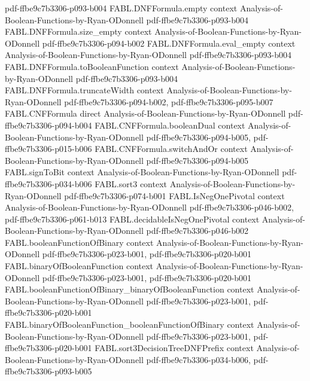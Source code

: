 \begin{theorem}
  {pdf-ffbe9c7b3306-p093-b004}
\proofstep
  {FABL.DNFFormula.empty}
  {context}
  {Analysis-of-Boolean-Functions-by-Ryan-ODonnell}
  {pdf-ffbe9c7b3306-p093-b004}
\proofstep
  {FABL.DNFFormula.size_empty}
  {context}
  {Analysis-of-Boolean-Functions-by-Ryan-ODonnell}
  {pdf-ffbe9c7b3306-p094-b002}
\proofstep
  {FABL.DNFFormula.eval_empty}
  {context}
  {Analysis-of-Boolean-Functions-by-Ryan-ODonnell}
  {pdf-ffbe9c7b3306-p093-b004}
\proofstep
  {FABL.DNFFormula.toBooleanFunction}
  {context}
  {Analysis-of-Boolean-Functions-by-Ryan-ODonnell}
  {pdf-ffbe9c7b3306-p093-b004}
\proofstep
  {FABL.DNFFormula.truncateWidth}
  {context}
  {Analysis-of-Boolean-Functions-by-Ryan-ODonnell}
  {pdf-ffbe9c7b3306-p094-b002,
    pdf-ffbe9c7b3306-p095-b007}
\proofstep
  {FABL.CNFFormula}
  {direct}
  {Analysis-of-Boolean-Functions-by-Ryan-ODonnell}
  {pdf-ffbe9c7b3306-p094-b004}
\proofstep
  {FABL.CNFFormula.booleanDual}
  {context}
  {Analysis-of-Boolean-Functions-by-Ryan-ODonnell}
  {pdf-ffbe9c7b3306-p094-b005,
    pdf-ffbe9c7b3306-p015-b006}
\proofstep
  {FABL.CNFFormula.switchAndOr}
  {context}
  {Analysis-of-Boolean-Functions-by-Ryan-ODonnell}
  {pdf-ffbe9c7b3306-p094-b005}
\proofstep
  {FABL.signToBit}
  {context}
  {Analysis-of-Boolean-Functions-by-Ryan-ODonnell}
  {pdf-ffbe9c7b3306-p034-b006}
\proofstep
  {FABL.sort3}
  {context}
  {Analysis-of-Boolean-Functions-by-Ryan-ODonnell}
  {pdf-ffbe9c7b3306-p074-b001}
\proofstep
  {FABL.IsNegOnePivotal}
  {context}
  {Analysis-of-Boolean-Functions-by-Ryan-ODonnell}
  {pdf-ffbe9c7b3306-p046-b002,
    pdf-ffbe9c7b3306-p061-b013}
\proofstep
  {FABL.decidableIsNegOnePivotal}
  {context}
  {Analysis-of-Boolean-Functions-by-Ryan-ODonnell}
  {pdf-ffbe9c7b3306-p046-b002}
\proofstep
  {FABL.booleanFunctionOfBinary}
  {context}
  {Analysis-of-Boolean-Functions-by-Ryan-ODonnell}
  {pdf-ffbe9c7b3306-p023-b001,
    pdf-ffbe9c7b3306-p020-b001}
\proofstep
  {FABL.binaryOfBooleanFunction}
  {context}
  {Analysis-of-Boolean-Functions-by-Ryan-ODonnell}
  {pdf-ffbe9c7b3306-p023-b001,
    pdf-ffbe9c7b3306-p020-b001}
\proofstep
  {FABL.booleanFunctionOfBinary_binaryOfBooleanFunction}
  {context}
  {Analysis-of-Boolean-Functions-by-Ryan-ODonnell}
  {pdf-ffbe9c7b3306-p023-b001,
    pdf-ffbe9c7b3306-p020-b001}
\proofstep
  {FABL.binaryOfBooleanFunction_booleanFunctionOfBinary}
  {context}
  {Analysis-of-Boolean-Functions-by-Ryan-ODonnell}
  {pdf-ffbe9c7b3306-p023-b001,
    pdf-ffbe9c7b3306-p020-b001}
\proofstep
  {FABL.sort3DecisionTreeDNFPrefix}
  {context}
  {Analysis-of-Boolean-Functions-by-Ryan-ODonnell}
  {pdf-ffbe9c7b3306-p034-b006,
    pdf-ffbe9c7b3306-p093-b005}

\end{theorem}
